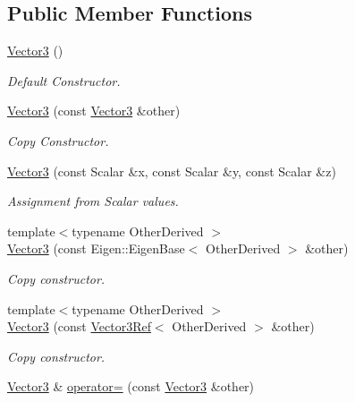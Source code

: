 \subsection*{Public Member Functions}
\begin{DoxyCompactItemize}
\item 
\hyperlink{classow__core_1_1Vector3_ae2c63c465a844cf260607beed2851620}{Vector3} ()\hypertarget{classow__core_1_1Vector3_ae2c63c465a844cf260607beed2851620}{}\label{classow__core_1_1Vector3_ae2c63c465a844cf260607beed2851620}

\begin{DoxyCompactList}\small\item\em Default Constructor. \end{DoxyCompactList}\item 
\hyperlink{classow__core_1_1Vector3_ae4a885b0b4b4a2c8aa09163c1c05d49e}{Vector3} (const \hyperlink{classow__core_1_1Vector3}{Vector3} \&other)\hypertarget{classow__core_1_1Vector3_ae4a885b0b4b4a2c8aa09163c1c05d49e}{}\label{classow__core_1_1Vector3_ae4a885b0b4b4a2c8aa09163c1c05d49e}

\begin{DoxyCompactList}\small\item\em Copy Constructor. \end{DoxyCompactList}\item 
\hyperlink{classow__core_1_1Vector3_ab4e68ba3b96f153fe14408823a600332}{Vector3} (const Scalar \&x, const Scalar \&y, const Scalar \&z)\hypertarget{classow__core_1_1Vector3_ab4e68ba3b96f153fe14408823a600332}{}\label{classow__core_1_1Vector3_ab4e68ba3b96f153fe14408823a600332}

\begin{DoxyCompactList}\small\item\em Assignment from Scalar values. \end{DoxyCompactList}\item 
{\footnotesize template$<$typename Other\+Derived $>$ }\\\hyperlink{classow__core_1_1Vector3_ac80729ad78e79dff06e14d95b372945a}{Vector3} (const Eigen\+::\+Eigen\+Base$<$ Other\+Derived $>$ \&other)
\begin{DoxyCompactList}\small\item\em Copy constructor. \end{DoxyCompactList}\item 
{\footnotesize template$<$typename Other\+Derived $>$ }\\\hyperlink{classow__core_1_1Vector3_a9b50ee7c21a7cbbc1c134138f25ace8e}{Vector3} (const \hyperlink{classow__core_1_1Vector3Ref}{Vector3\+Ref}$<$ Other\+Derived $>$ \&other)
\begin{DoxyCompactList}\small\item\em Copy constructor. \end{DoxyCompactList}\item 
\hyperlink{classow__core_1_1Vector3}{Vector3} \& \hyperlink{classow__core_1_1Vector3_a32cd0eb6c698d0e66b42d41718558d7a}{operator=} (const \hyperlink{classow__core_1_1Vector3}{Vector3} \&other)\hypertarget{classow__core_1_1Vector3_a32cd0eb6c698d0e66b42d41718558d7a}{}\label{classow__core_1_1Vector3_a32cd0eb6c698d0e66b42d41718558d7a}


\end{DoxyCompactItemize}
